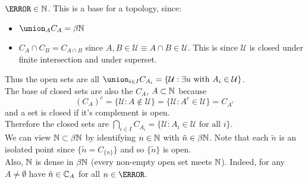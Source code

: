 \documentclass[a4paper]{article}
\renewcommand{\U}{\mathcal{U}}
\begin{document}
  $\A \in \N$. This is a base for a topology, since:
  \begin{itemize}
  \item $\union_{A}C_A = \beta\N$
  \item $C_A \cap C_B = C_{A \cap B}$ since $A, B \in \U \equiv A \cap B
    \in \U$. This is since $\U$ is closed under finite intersection and
    under superset.
  \end{itemize}
  Thus the open sets are all $\union_{i \in I} C_{A_i} = \{\U : \exists u
  \text{ with } A_i \in \U\}$.\\
  The base of closed sets are also the $C_A$, $A \subset \mathbb{N}$ because
  \[(C_A)^c = \{\U : A \not\in \U\} = \{\U : A^c \in \U\} = C_{A^c}\]
  and a set is closed if it's complement is open.\\
  Therefore the closed sets are $\bigcap_{i \in I} C_{A_i} = \{\U : A_i
  \in \U \text{ for all } i\}$.\\

  We can view $\mathbb{N} \subset \beta\mathbb{N}$ by identifying $n \in \mathbb{N}$ with $\tilde{n} \in
  \beta\mathbb{N}$. Note that each $\tilde{n}$ is an isolated point since $\{\tilde{n} =
  C_{\{n\}}\}$ and so $\{\tilde{n}\}$ is open.\\
  Also, $\mathbb{N}$ is dense in $\beta\mathbb{N}$ (every non-empty open set meets $\mathbb{N}$).
  Indeed, for any $A \neq \emptyset$ have $\tilde{n} \in \mathbb{C}_A$ for all $n \in
  \A$.
\end{document}
